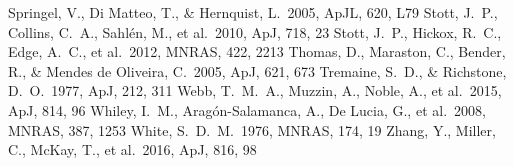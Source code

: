 \documentclass[
12pt, %
spanish,
singlespacing, %
headsepline, %
]{MastersDoctoralThesis} %
\def\apj {ApJ}
\def\apjl {ApJL}
\def\mnras {MNRAS}
\def\apj {ApJ}
\begin{document}
\begin{thebibliography}{X}
    Springel, V., Di Matteo, T., \& Hernquist, L.\ 2005, \apjl, 620, L79 
    Stott, J.~P., Collins, C.~A., Sahl{\'e}n, M., et al.\ 2010, \apj, 718, 23 
    Stott, J.~P., Hickox, R.~C., Edge, A.~C., et al.\ 2012, \mnras, 422, 2213 
    Thomas, D., Maraston, C., Bender, R., \& Mendes de Oliveira, C.\ 2005, \apj, 621, 673  
    Tremaine, S.~D., \& Richstone, D.~O.\ 1977, \apj, 212, 311 
    Webb, T.~M.~A., Muzzin, A., Noble, A., et al.\ 2015, \apj, 814, 96 
    Whiley, I.~M., Arag{\'o}n-Salamanca, A., De Lucia, G., et al.\ 2008, \mnras, 387, 1253 
    White, S.~D.~M.\ 1976, \mnras, 174, 19 
    Zhang, Y., Miller, C., McKay, T., et al.\ 2016, \apj, 816, 98
  
  
\end{thebibliography}

  
\end{document}
